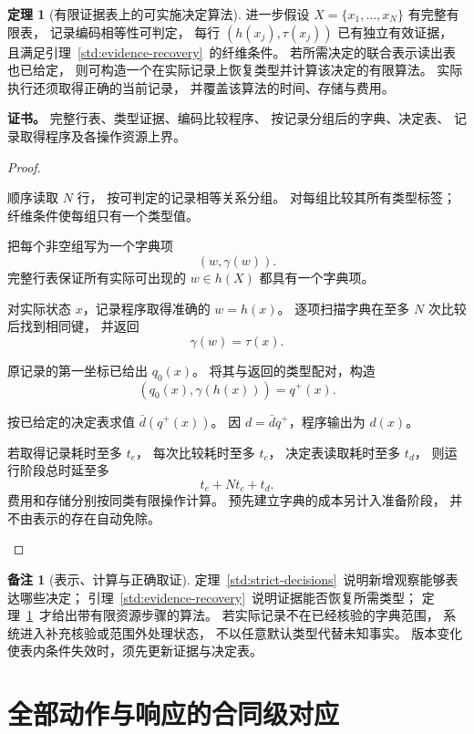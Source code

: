 \documentclass[UTF8,12pt,a4paper,openany,fontset=none,zihao=false]{ctexrep}
\theoremstyle{definition}
\newtheorem{theorem}{定理}[chapter]
\newtheorem{remark}{备注}[chapter]
\newenvironment{certificate}{\par\noindent\textbf{证书。}\ignorespaces}{\par}
\newcommand{\1}{\mathbf 1}
\begin{document}
\begin{theorem}[有限证据表上的可实施决定算法]
\label{std:finite-decision}
进一步假设 \(X=\{x_1,\ldots,x_N\}\) 有完整有限表，
记录编码相等性可判定，
每行 \((h(x_j),\tau(x_j))\) 已有独立有效证据，
且满足引理~\ref{std:evidence-recovery}~的纤维条件。
若所需决定的联合表示读出表也已给定，
则可构造一个在实际记录上恢复类型并计算该决定的有限算法。
实际执行还须取得正确的当前记录，
并覆盖该算法的时间、存储与费用。
\end{theorem}
\begin{certificate}
完整行表、类型证据、编码比较程序、
按记录分组后的字典、决定表、
记录取得程序及各操作资源上界。
\end{certificate}
\begin{proof}
\begin{semanticsteps}
\item 顺序读取 \(N\) 行，
按可判定的记录相等关系分组。
对每组比较其所有类型标签；
纤维条件使每组只有一个类型值。
\item 把每个非空组写为一个字典项
\[
(w,\gamma(w)).
\]
完整行表保证所有实际可出现的 \(w\in h(X)\)
都具有一个字典项。
\item 对实际状态 \(x\)，记录程序取得准确的 \(w=h(x)\)。
逐项扫描字典在至多 \(N\) 次比较后找到相同键，
并返回
\[
\gamma(w)=\tau(x).
\]
\item 原记录的第一坐标已给出 \(q_0(x)\)。
将其与返回的类型配对，构造
\[
(q_0(x),\gamma(h(x)))=q^+(x).
\]
\item 按已给定的决定表求值 \(\bar d(q^+(x))\)。
因 \(d=\bar d q^+\)，程序输出为 \(d(x)\)。
\item 若取得记录耗时至多 \(t_e\)，
每次比较耗时至多 \(t_c\)，
决定表读取耗时至多 \(t_d\)，
则运行阶段总时延至多
\[
t_e+Nt_c+t_d.
\]
费用和存储分别按同类有限操作计算。
预先建立字典的成本另计入准备阶段，
并不由表示的存在自动免除。
\end{semanticsteps}
\end{proof}

\begin{remark}[表示、计算与正确取证]
定理~\ref{std:strict-decisions}~说明新增观察能够表达哪些决定；
引理~\ref{std:evidence-recovery}~说明证据能否恢复所需类型；
定理~\ref{std:finite-decision}~才给出带有限资源步骤的算法。
若实际记录不在已经核验的字典范围，
系统进入补充核验或范围外处理状态，
不以任意默认类型代替未知事实。
版本变化使表内条件失效时，须先更新证据与决定表。
\end{remark}

\section{全部动作与响应的合同级对应}
\end{document}
